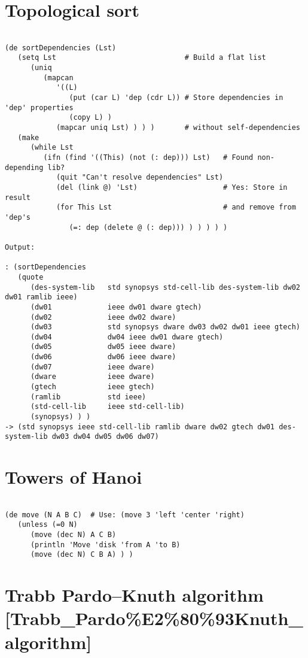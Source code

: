 \section*{Topological sort}

\begin{verbatim}

(de sortDependencies (Lst)
   (setq Lst                              # Build a flat list
      (uniq
         (mapcan
            '((L)
               (put (car L) 'dep (cdr L)) # Store dependencies in 'dep' properties
               (copy L) )
            (mapcar uniq Lst) ) ) )       # without self-dependencies
   (make
      (while Lst
         (ifn (find '((This) (not (: dep))) Lst)   # Found non-depending lib?
            (quit "Can't resolve dependencies" Lst)
            (del (link @) 'Lst)                    # Yes: Store in result
            (for This Lst                          # and remove from 'dep's
               (=: dep (delete @ (: dep))) ) ) ) ) )

Output:

: (sortDependencies
   (quote
      (des-system-lib   std synopsys std-cell-lib des-system-lib dw02 dw01 ramlib ieee)
      (dw01             ieee dw01 dware gtech)
      (dw02             ieee dw02 dware)
      (dw03             std synopsys dware dw03 dw02 dw01 ieee gtech)
      (dw04             dw04 ieee dw01 dware gtech)
      (dw05             dw05 ieee dware)
      (dw06             dw06 ieee dware)
      (dw07             ieee dware)
      (dware            ieee dware)
      (gtech            ieee gtech)
      (ramlib           std ieee)
      (std-cell-lib     ieee std-cell-lib)
      (synopsys) ) )
-> (std synopsys ieee std-cell-lib ramlib dware dw02 gtech dw01 des-system-lib dw03 dw04 dw05 dw06 dw07)

\end{verbatim}

\section*{Towers of Hanoi}

\begin{verbatim}

(de move (N A B C)  # Use: (move 3 'left 'center 'right)
   (unless (=0 N)
      (move (dec N) A C B)
      (println 'Move 'disk 'from A 'to B)
      (move (dec N) C B A) ) )

\end{verbatim}

\section*{Trabb Pardo–Knuth algorithm [Trabb_Pardo\%E2\%80\%93Knuth_algorithm]}

